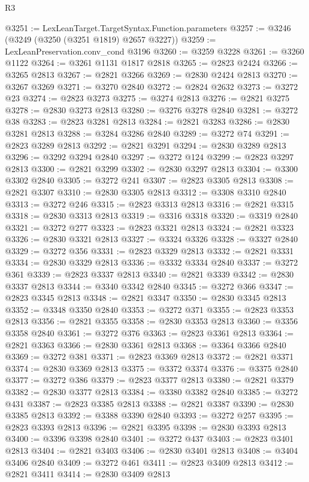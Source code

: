 \begin{lexlean}{R3}
\begin{coremodule}
@3251 := LexLeanTarget.TargetSyntax.Function.parameters
@3257 := @3246 (@3249 (@3250 (@3251 @1819) @2657 @3227))
@3259 := LexLeanPreservation.conv_cond @3196
@3260 := @3259 @3228
@3261 := @3260 @1122
@3264 := @3261 @1131 @1817 @2818
@3265 := @2823 @2424
@3266 := @3265 @2813
@3267 := @2821 @3266
@3269 := @2830 @2424 @2813
@3270 := @3267 @3269
@3271 := @3270 @2840
@3272 := @2824 @2632
@3273 := @3272 @23
@3274 := @2823 @3273
@3275 := @3274 @2813
@3276 := @2821 @3275
@3278 := @2830 @3273 @2813
@3280 := @3276 @3278 @2840
@3281 := @3272 @38
@3283 := @2823 @3281 @2813
@3284 := @2821 @3283
@3286 := @2830 @3281 @2813
@3288 := @3284 @3286 @2840
@3289 := @3272 @74
@3291 := @2823 @3289 @2813
@3292 := @2821 @3291
@3294 := @2830 @3289 @2813
@3296 := @3292 @3294 @2840
@3297 := @3272 @124
@3299 := @2823 @3297 @2813
@3300 := @2821 @3299
@3302 := @2830 @3297 @2813
@3304 := @3300 @3302 @2840
@3305 := @3272 @241
@3307 := @2823 @3305 @2813
@3308 := @2821 @3307
@3310 := @2830 @3305 @2813
@3312 := @3308 @3310 @2840
@3313 := @3272 @246
@3315 := @2823 @3313 @2813
@3316 := @2821 @3315
@3318 := @2830 @3313 @2813
@3319 := @3316 @3318
@3320 := @3319 @2840
@3321 := @3272 @277
@3323 := @2823 @3321 @2813
@3324 := @2821 @3323
@3326 := @2830 @3321 @2813
@3327 := @3324 @3326
@3328 := @3327 @2840
@3329 := @3272 @356
@3331 := @2823 @3329 @2813
@3332 := @2821 @3331
@3334 := @2830 @3329 @2813
@3336 := @3332 @3334 @2840
@3337 := @3272 @361
@3339 := @2823 @3337 @2813
@3340 := @2821 @3339
@3342 := @2830 @3337 @2813
@3344 := @3340 @3342 @2840
@3345 := @3272 @366
@3347 := @2823 @3345 @2813
@3348 := @2821 @3347
@3350 := @2830 @3345 @2813
@3352 := @3348 @3350 @2840
@3353 := @3272 @371
@3355 := @2823 @3353 @2813
@3356 := @2821 @3355
@3358 := @2830 @3353 @2813
@3360 := @3356 @3358 @2840
@3361 := @3272 @376
@3363 := @2823 @3361 @2813
@3364 := @2821 @3363
@3366 := @2830 @3361 @2813
@3368 := @3364 @3366 @2840
@3369 := @3272 @381
@3371 := @2823 @3369 @2813
@3372 := @2821 @3371
@3374 := @2830 @3369 @2813
@3375 := @3372 @3374
@3376 := @3375 @2840
@3377 := @3272 @386
@3379 := @2823 @3377 @2813
@3380 := @2821 @3379
@3382 := @2830 @3377 @2813
@3384 := @3380 @3382 @2840
@3385 := @3272 @431
@3387 := @2823 @3385 @2813
@3388 := @2821 @3387
@3390 := @2830 @3385 @2813
@3392 := @3388 @3390 @2840
@3393 := @3272 @257
@3395 := @2823 @3393 @2813
@3396 := @2821 @3395
@3398 := @2830 @3393 @2813
@3400 := @3396 @3398 @2840
@3401 := @3272 @437
@3403 := @2823 @3401 @2813
@3404 := @2821 @3403
@3406 := @2830 @3401 @2813
@3408 := @3404 @3406 @2840
@3409 := @3272 @461
@3411 := @2823 @3409 @2813
@3412 := @2821 @3411
@3414 := @2830 @3409 @2813

\end{coremodule}
\end{lexlean}
